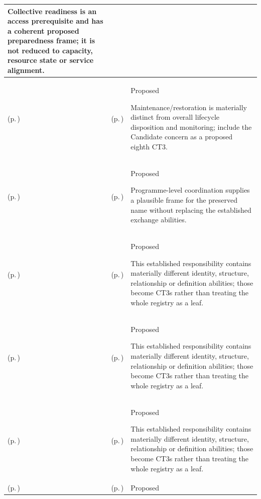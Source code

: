 \begin{longtable}{|>{\raggedright\arraybackslash}p{0.27\TableWidth}|>{\raggedright\arraybackslash}p{0.27\TableWidth}|>{\raggedright\arraybackslash}p{0.46\TableWidth}|}
Collective readiness is an access prerequisite and has a coherent proposed preparedness frame; it is not reduced to capacity, resource state or service alignment.\\\hline
\nameref{cap:bc-clinical-technology-management} (p.\,\pageref{cap:bc-clinical-technology-management}) & \nameref{cap:bc-clinical-device-maintenance-management} (p.\,\pageref{cap:bc-clinical-device-maintenance-management}) & Proposed

Maintenance/restoration is materially distinct from overall lifecycle disposition and monitoring; include the Candidate concern as a proposed eighth CT3.\\\hline
\nameref{cap:bc-health-information-exchange} (p.\,\pageref{cap:bc-health-information-exchange}) & \nameref{cap:bc-health-information-sharing-programme-management} (p.\,\pageref{cap:bc-health-information-sharing-programme-management}) & Proposed

Programme-level coordination supplies a plausible frame for the preserved name without replacing the established exchange abilities.\\\hline
\nameref{cap:bec-healthcare-entity-information-enablement} (p.\,\pageref{cap:bec-healthcare-entity-information-enablement}) & \nameref{cap:bec-client-administration} (p.\,\pageref{cap:bec-client-administration}) & Proposed

This established responsibility contains materially different identity, structure, relationship or definition abilities; those become CT3s rather than treating the whole registry as a leaf.\\\hline
\nameref{cap:bec-healthcare-entity-information-enablement} (p.\,\pageref{cap:bec-healthcare-entity-information-enablement}) & \nameref{cap:bec-provider-administration} (p.\,\pageref{cap:bec-provider-administration}) & Proposed

This established responsibility contains materially different identity, structure, relationship or definition abilities; those become CT3s rather than treating the whole registry as a leaf.\\\hline
\nameref{cap:bec-healthcare-entity-information-enablement} (p.\,\pageref{cap:bec-healthcare-entity-information-enablement}) & \nameref{cap:bec-organisation-administration} (p.\,\pageref{cap:bec-organisation-administration}) & Proposed

This established responsibility contains materially different identity, structure, relationship or definition abilities; those become CT3s rather than treating the whole registry as a leaf.\\\hline
\nameref{cap:bec-healthcare-entity-information-enablement} (p.\,\pageref{cap:bec-healthcare-entity-information-enablement}) & \nameref{cap:bec-location-administration} (p.\,\pageref{cap:bec-location-administration}) & Proposed


\end{longtable}
